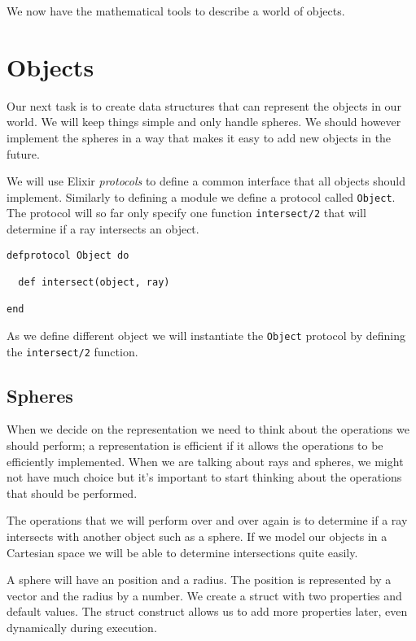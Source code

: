 \documentclass[a4paper,11pt]{article}
\begin{document}
We now have the mathematical tools to describe a world of objects.



\section{Objects}

Our next task is to create data structures that can
represent the objects in our world. We will keep things simple and
only handle spheres. We should however implement the spheres in a way
that makes it easy to add new objects in the future.

We will use Elixir {\em protocols} to define a common interface that
all objects should implement. Similarly to defining a module we define
a protocol called {\tt Object}. The protocol will so far only specify
one function {\tt intersect/2} that will determine if a ray
intersects an object.

\begin{verbatim}
defprotocol Object do

  def intersect(object, ray)
  
end
\end{verbatim}

As we define different object we will instantiate the {\tt Object}
protocol by defining the {\tt intersect/2} function. 

\subsection*{Spheres}

When we decide on the representation we need to think about the
operations we should perform; a representation is efficient if it
allows the operations to be efficiently implemented. When we are
talking about rays and spheres, we might not have much choice but it's
important to start thinking about the operations that should be
performed.

The operations that we will perform over and over again is to
determine if a ray intersects with another object such as a sphere. If
we model our objects in a Cartesian space we will be able to
determine intersections quite easily.

A sphere will have an position and a radius. The position is
represented by a vector and the radius by a number. We create a struct
with two properties and default values. The struct construct allows us
to add more properties later, even dynamically during execution. 
\end{document}
